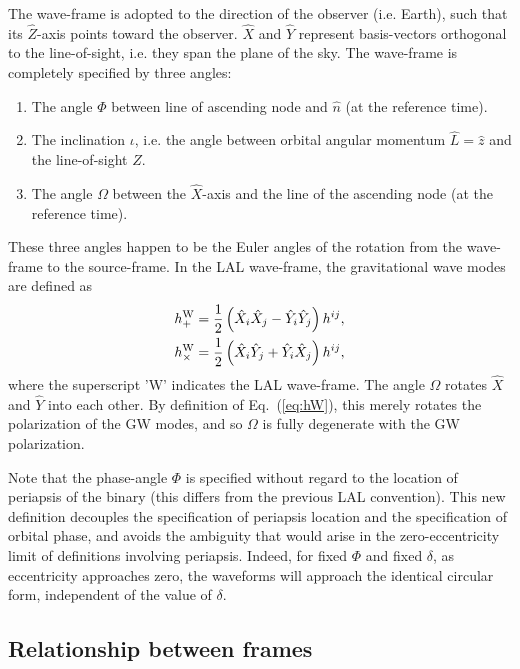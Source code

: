 \documentclass[11pt,tightenlines,article,amssymb,amsmath,amsfonts,superscriptaddress,nofootinbib]{revtex4}
\newcommand{\nNR}{\hat{n}}
\newcommand{\lNR}{\hat L}
\newcommand{\EzS}{{{\hat z}}}
\newcommand{\ExW}{\hat X}
\newcommand{\EyW}{\hat Y}
\newcommand{\EzW}{\hat Z}
\newcommand{\hpW}{h_+^{\rm W}}
\newcommand{\hcW}{h_\times^{\rm W}}
\newcommand{\phiRef}{\Phi} %
\newcommand{\meanAnomaly}{\delta} %
\begin{document}
The wave-frame is adopted to the direction of the observer
(i.e. Earth), such that its $\EzW$-axis points toward the observer.
$\ExW$ and $\EyW$ represent basis-vectors orthogonal to the
line-of-sight, i.e. they span the plane of the sky.
The wave-frame is completely specified by three angles:
\begin{enumerate}
  \item The angle $\phiRef$ between line of ascending node and $\nNR$
    (at the reference time). 
  \item The inclination $\iota$, i.e. the angle between orbital
    angular momentum $\lNR=\EzS$ and the line-of-sight $\EzW$.
  \item The angle $\Omega$ between the $\ExW$-axis and the line of the
    ascending node (at the reference time).
\end{enumerate}
These three angles happen to be the Euler angles of the rotation from
the wave-frame to the source-frame. In the LAL wave-frame, the gravitational wave modes are defined as
\begin{subequations}
  \label{eq:hW}
  \begin{align}
       \hpW &= \frac{1}{2}\left(\ExW_i\ExW_j-\EyW_i\EyW_j\right)h^{ij},\\
       \hcW &= \frac{1}{2}\left(\ExW_i\EyW_j+\EyW_i\ExW_j\right)h^{ij},
  \end{align}
\end{subequations}
where the superscript 'W' indicates the LAL wave-frame.  The angle
$\Omega$ rotates $\ExW$ and $\EyW$ into each other. By
definition of Eq.~(\ref{eq:hW}), this merely rotates the polarization of
the GW modes, and so $\Omega$ is fully degenerate with the GW
polarization.

Note that the phase-angle $\phiRef$ is specified without regard to the
location of periapsis of the binary (this differs from the previous LAL
convention).  This new definition decouples the specification of
periapsis location and the specification of orbital phase, and avoids
the ambiguity that would arise in the zero-eccentricity limit of
definitions involving periapsis. Indeed, for fixed $\phiRef$ and fixed
$\meanAnomaly$, as eccentricity approaches zero, the waveforms will
approach the identical circular form, independent of the value of
$\meanAnomaly$.

\subsection{Relationship between frames}
\label{sec:Relations}
\end{document}

